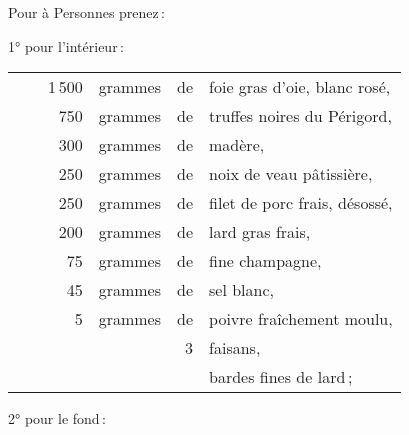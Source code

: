 Pour {\mmm} à {\mmm} Personnes prenez :

\medskip

1° pour l'intérieur :

\footnotesize
\begin{longtable}{rrrrrp{18em}}
 & \hspace{2em} & 1 500 & grammes & de & foie gras d'oie, blanc rosé,                                     \\
 & \hspace{2em} &   750 & grammes & de & truffes noires du Périgord,                                      \\
 & \hspace{2em} &   300 & grammes & de & madère,                                                          \\
 & \hspace{2em} &   250 & grammes & de & noix de veau pâtissière,                                         \\
 & \hspace{2em} &   250 & grammes & de & filet de porc frais, désossé,                                    \\
 & \hspace{2em} &   200 & grammes & de & lard gras frais,                                                 \\
 & \hspace{2em} &    75 & grammes & de & fine champagne,                                                  \\
 & \hspace{2em} &    45 & grammes & de & sel blanc,                                                       \\
 & \hspace{2em} &     5 & grammes & de & poivre fraîchement moulu,                                        \\
 & \hspace{2em} &       &         &  3 & faisans,                                                         \\
 & \hspace{2em} &       &         &    & bardes fines de lard ;                                           \\
\end{longtable}
\normalsize

2° pour le fond :

